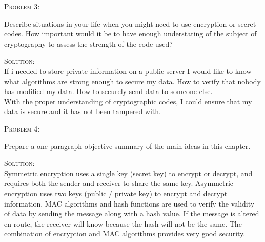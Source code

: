 \documentclass[12pt]{article}
\newenvironment{problem}[1]
{\begin{mdframed}[linewidth=0.8pt]
        \textsc{Problem #1:}

}
    {\end{mdframed}}
\newenvironment{solution}
    {\textsc{Solution:}\\}
    {\newpage}%
\begin{document}
	\begin{problem}{3}
		Describe situations in your life when you might need to
		use encryption or secret codes. How important would it be
		to have enough understating of the subject of cryptography
		to assess the strength of the code used?
	\end{problem}
	\begin{solution}
		If i needed to store private information on a public server I
		would like to know what algorithms are strong enough to secure
		my data. How to verify that nobody has modified my data. How to
		securely send data to someone else.\\
		With the proper understanding of cryptographic codes, I could
		ensure that my data is secure and it has not been tampered with.
	\end{solution}

	\begin{problem}{4}
		Prepare a one paragraph objective summary of the main ideas
		in this chapter.
	\end{problem}
	\begin{solution}
		Symmetric encryption uses a single key (secret key) to encrypt or decrypt,
		and requires both the sender and receiver to share the same key.
		Asymmetric encryption uses two keys (public / private key) to
		encrypt and decrypt information. MAC algorithms and hash functions
		are used to verify the validity of data by sending the message along with
		a hash value. If the message is altered en route, the receiver will
		know because the hash will not be the same. The combination of encryption
		and MAC algorithms provides very good security.
	\end{solution}
\end{document}
